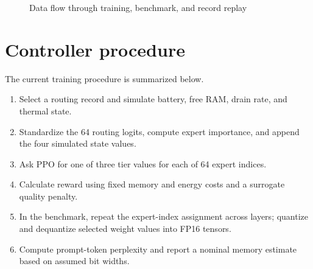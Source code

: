 \documentclass[12pt,a4paper]{report}
\begin{document}
\begin{figure}[ht]
\centering
{}
\caption{Data flow through training, benchmark, and record replay}
\label{fig:dataflow}
\end{figure}

\section{Controller procedure}
The current training procedure is summarized below.
\begin{enumerate}
  \item Select a routing record and simulate battery, free RAM, drain rate, and thermal state.
  \item Standardize the 64 routing logits, compute expert importance, and append the four simulated state values.
  \item Ask PPO for one of three tier values for each of 64 expert indices.
  \item Calculate reward using fixed memory and energy costs and a surrogate quality penalty.
  \item In the benchmark, repeat the expert-index assignment across layers; quantize and dequantize selected weight values into FP16 tensors.
  \item Compute prompt-token perplexity and report a nominal memory estimate based on assumed bit widths.
\end{enumerate}
\end{document}
